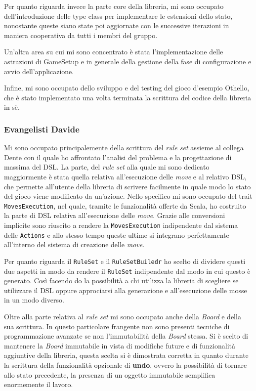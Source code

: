 Per quanto riguarda invece la parte core della libreria, mi sono occupato dell'introduzione delle type class per implementare le estensioni dello stato, nonostante queste siano state poi aggiornate con le successive iterazioni in maniera cooperativa da tutti i membri del gruppo.

Un'altra area su cui mi sono concentrato è stata l'implementazione delle astrazioni di GameSetup e in generale della gestione della fase di configurazione e avvio dell'applicazione.

Infine, mi sono occupato dello sviluppo e del testing del gioco d'esempio Othello, che è stato implementato una volta terminata la scrittura del codice della libreria in sè.

\subsubsection{Evangelisti Davide}
Mi sono occupato principalemente della scrittura del \textit{rule set} assieme al collega Dente con il quale ho affrontato l'analisi del problema e la progettazione di massima del DSL.
%
La parte, del \textit{rule set} alla quale mi sono dedicato maggiormente è stata quella relativa all'esecuzione delle \textit{move} e al relativo DSL, che permette all'utente della libreria di scrivere facilmente in quale modo lo stato del gioco viene modificato da un'azione.
%
Nello specifico mi sono occupato del trait \texttt{MovesExecution}, nel quale, tramite le funzionalità offerte da Scala, ho costruito la parte di DSL relativa all'esecuzione delle \textit{move}.
%
Grazie alle conversioni implicite sono riuscito a rendere la \texttt{MovesExecution} indipendente dal sistema delle \texttt{Actions} e allo stesso tempo queste ultime si integrano perfettamente all'interno del sistema di creazione delle \textit{move}.

Per quanto riguarda il \texttt{RuleSet} e il \texttt{RuleSetBuiledr} ho scelto di dividere questi due aspetti in modo da rendere il \texttt{RuleSet} indipendente dal modo in cui questo è generato.
%
Così facendo do la possibilità a chi utilizza la libreria di scegliere se utilizzare il DSL oppure approciarsi alla generazione e all'esecuzione delle mosse in un modo diverso.

Oltre alla parte relativa al \textit{rule set} mi sono occupato anche della \textit{Board} e della sua scrittura.
%
In questo particolare frangente non sono presenti tecniche di programmazione avanzate se non l'immutabilità della \textit{Board} stessa.
%
Si è scelto di mantenere la \textit{Board} immutabile in vista di modifiche future e di funzionalità aggiuntive della libreria, questa scelta si è dimostrata corretta in quanto durante la scrittura della funzionalità opzionale di \textbf{undo}, ovvero la possibilità di tornare allo stato precedente, la presenza di un oggetto immutabile semplifica enormemente il lavoro.

